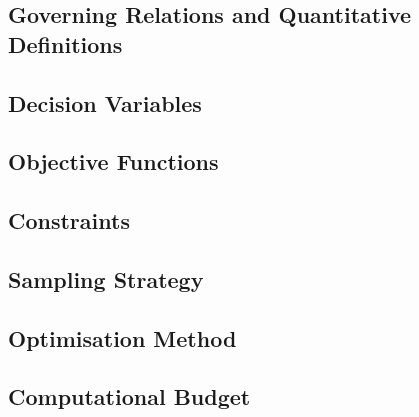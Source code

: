 \subsection{Governing Relations and Quantitative Definitions}
\label{sec:res-opt-bud-governing-relations}

%

\subsection{Decision Variables}
\label{sec:res-opt-bud-decision-variables}


\subsection{Objective Functions}
\label{sec:res-opt-bud-objective-functions}


\subsection{Constraints}
\label{sec:res-opt-bud-constraints}


\subsection{Sampling Strategy}
\label{sec:res-opt-bud-sampling-strategy}


\subsection{Optimisation Method}
\label{sec:res-opt-bud-optimisation-method}


\subsection{Computational Budget}
\label{sec:res-opt-bud-computational-budget}

